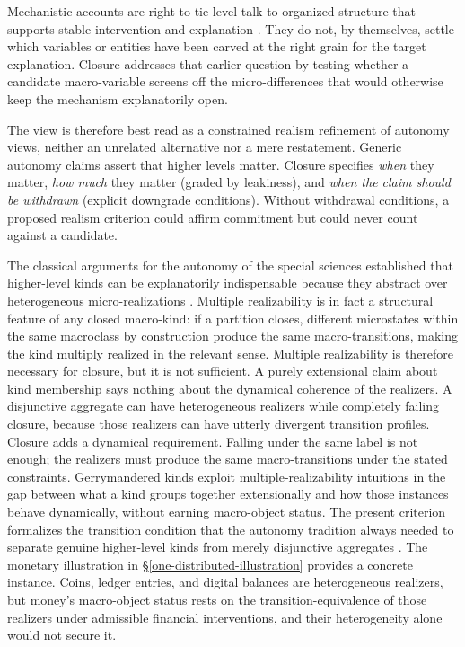 Mechanistic accounts are right to tie level talk to organized structure
that supports stable intervention and explanation
\citep{machamer2000,craver2007}. They do not, by themselves, settle
which variables or entities have been carved at the right grain for the
target explanation. Closure addresses that earlier question by testing
whether a candidate macro-variable screens off the micro-differences
that would otherwise keep the mechanism explanatorily open.

The view is therefore best read as a constrained realism refinement of
autonomy views, neither an unrelated alternative nor a mere
restatement. Generic autonomy claims assert that higher levels matter.
Closure specifies \emph{when} they matter, \emph{how much} they matter
(graded by leakiness), and \emph{when the claim should be withdrawn}
(explicit downgrade conditions). Without withdrawal conditions, a
proposed realism criterion could affirm commitment but could never
count against a candidate.

The classical arguments for the autonomy of the special sciences
established that higher-level kinds can be explanatorily indispensable
because they abstract over heterogeneous micro-realizations
\citep{putnam1967,fodor1974}. Multiple realizability is in fact a
structural feature of any closed macro-kind: if a partition closes,
different microstates within the same macroclass by construction
produce the same macro-transitions, making the kind multiply realized
in the relevant sense. Multiple realizability is therefore necessary
for closure, but it is not sufficient. A purely extensional claim about
kind membership says nothing about the dynamical coherence of the
realizers. A disjunctive aggregate can have heterogeneous realizers
while completely failing closure, because those realizers can have
utterly divergent transition profiles. Closure adds a dynamical
requirement. Falling under the same label is not enough; the realizers
must produce the same macro-transitions under the stated constraints.
Gerrymandered kinds exploit multiple-realizability intuitions in the gap
between what a kind groups together extensionally and how those
instances behave dynamically, without earning macro-object status. The present criterion formalizes the transition condition that
the autonomy tradition always needed to separate genuine higher-level
kinds from merely disjunctive aggregates \citep{shapiro2000}. The
monetary illustration in \S\ref{one-distributed-illustration}
provides a concrete instance. Coins, ledger entries, and digital
balances are heterogeneous realizers, but money's macro-object status
rests on the transition-equivalence of those realizers under admissible
financial interventions, and their heterogeneity alone would not
secure it.

